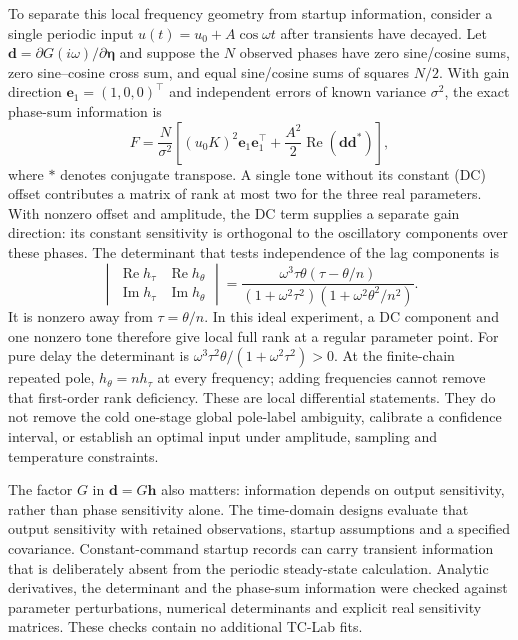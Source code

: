 To separate this local frequency geometry from startup information, consider
a single periodic input $u(t)=u_0+A\cos\omega t$ after transients have decayed.
Let $\bm d=\partial G(i\omega)/\partial\bm\eta$ and suppose the $N$ observed
phases have zero sine/cosine sums, zero sine--cosine cross sum, and equal
sine/cosine sums of squares $N/2$.
With gain direction $\bm e_1=(1,0,0)^\top$ and independent errors of known
variance $\sigma^2$, the exact phase-sum information is
\begin{equation}
 F=\frac{N}{\sigma^2}\left[
 (u_0K)^2\bm e_1\bm e_1^\top+
 \frac{A^2}{2}\operatorname{Re}(\bm d\bm d^{*})\right],
 \label{eq:periodic-information}
\end{equation}
where $*$ denotes conjugate transpose. A single tone without its constant (DC) offset
contributes a matrix of rank at most two for the three real parameters.
With nonzero offset and amplitude, the DC term supplies a separate gain direction:
its constant sensitivity is orthogonal to the oscillatory components over these
phases. The determinant that tests independence of the lag
components is
\begin{equation}
 \begin{vmatrix}
 \operatorname{Re}h_\tau&\operatorname{Re}h_\theta\\
 \operatorname{Im}h_\tau&\operatorname{Im}h_\theta
 \end{vmatrix}
 =\frac{\omega^3\tau\theta(\tau-\theta/n)}
 {(1+\omega^2\tau^2)(1+\omega^2\theta^2/n^2)}.
 \label{eq:frequency-lag-area}
\end{equation}
It is nonzero away from $\tau=\theta/n$. In this ideal experiment, a DC
component and one nonzero tone therefore give local full rank at a regular
parameter point. For pure delay the determinant is
$\omega^3\tau^2\theta/(1+\omega^2\tau^2)>0$.
At the finite-chain repeated pole, $h_\theta=nh_\tau$ at every frequency;
adding frequencies cannot remove that first-order rank deficiency.
These are local differential statements. They do not remove the cold one-stage
global pole-label ambiguity, calibrate a confidence interval, or establish an
optimal input under amplitude, sampling and temperature constraints.

The factor $G$ in $\bm d=G\bm h$ also matters: information depends on output
sensitivity, rather than phase sensitivity alone. The time-domain designs
evaluate that output sensitivity with retained observations, startup assumptions
and a specified covariance. Constant-command startup records can carry transient
information that is deliberately absent from the periodic steady-state calculation.
Analytic derivatives, the determinant and the phase-sum information were checked
against parameter perturbations, numerical determinants and explicit real
sensitivity matrices. These checks contain no additional TC-Lab fits.
